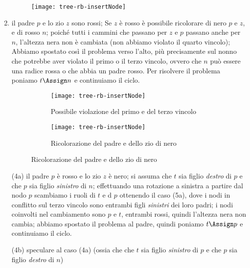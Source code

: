 \begin{enumerate}[label={\footnotesize\ttfamily (\arabic*)}, start=0]
	\vspace{-5pt}
	\begin{figure}[H]\centering
		\texttt{[image: tree-rb-insertNode]}
	\end{figure}

	\vspace{-5pt}
	\item il padre \(p\) e lo zio \(z\) sono rossi; Se \(z\) è rosso è possibile ricolorare di nero \(p\) e \(z\), e di rosso \(n\); poiché tutti i cammini che passano per \(z\) e \(p\) passano anche per \(n\), l'altezza nera non è cambiata (non abbiamo violato il quarto vincolo); Abbiamo spostato così il problema verso l'alto, più precisamente sul nonno che potrebbe aver violato il primo o il terzo vincolo, ovvero che \(n\) può essere una radice rossa o che abbia un padre rosso. Per risolvere il problema poniamo \(t \Assign n\) e continuiamo il ciclo.

	\vspace{-5pt}
	\begin{figure}[H]\centering
		\begin{subfigure}[t]{.5\textwidth}
			\texttt{[image: tree-rb-insertNode]}
			\caption{Possibile violazione del primo e del terzo vincolo}
		\end{subfigure}%
		\begin{subfigure}[t]{.5\textwidth}
			\texttt{[image: tree-rb-insertNode]}
			\caption{Ricolorazione del padre e dello zio di nero}
		\end{subfigure}
	\end{figure}

	\item[\footnotesize\ttfamily (4a)] il padre \(p\) è rosso e lo zio \(z\) è nero; si assuma che \(t\) sia figlio \emph{destro}  di \(p\) e che \(p\) sia figlio \emph{sinistro}  di \(n\); effettuando una rotazione a sinistra a partire dal nodo \(p\) scambiamo i ruoli di \(t\) e d \(p\) ottenendo il caso {\footnotesize\ttfamily (5a)}, dove i nodi in conflitto sul terzo vincolo sono entrambi figli \emph{sinistri} dei loro padri; i nodi coinvolti nel cambiamento sono \(p\) e \(t\), entrambi rossi, quindi l'altezza nera non cambia; abbiamo spostato il problema al padre, quindi poniamo \(t \Assign p\) e continuiamo il ciclo.

	\item[\footnotesize\ttfamily (4b)] speculare al caso {\footnotesize\ttfamily (4a)} (ossia che che \(t\) sia figlio \emph{sinistro}  di \(p\) e che \(p\) sia figlio \emph{destro}  di \(n\))


\end{enumerate}
